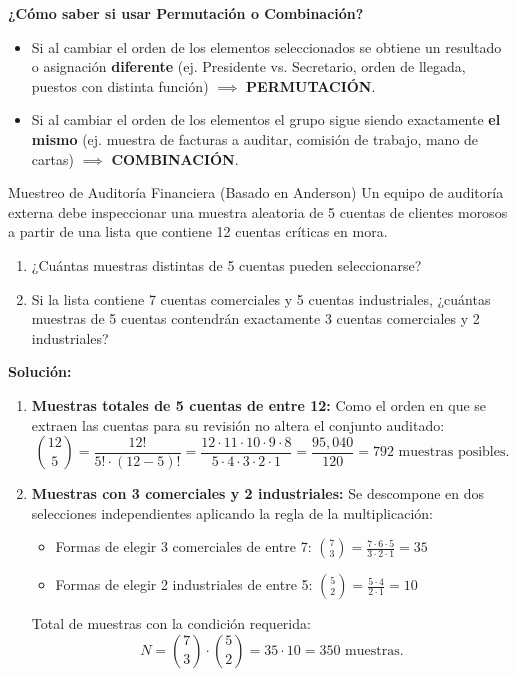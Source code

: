 \begin{alerta}
\textbf{¿Cómo saber si usar Permutación o Combinación?}
\begin{itemize}
    \item Si al cambiar el orden de los elementos seleccionados se obtiene un resultado o asignación \textbf{diferente} (ej. Presidente vs. Secretario, orden de llegada, puestos con distinta función) $\implies$ \textbf{PERMUTACIÓN}.
    \item Si al cambiar el orden de los elementos el grupo sigue siendo exactamente \textbf{el mismo} (ej. muestra de facturas a auditar, comisión de trabajo, mano de cartas) $\implies$ \textbf{COMBINACIÓN}.
\end{itemize}
\end{alerta}

\begin{ejemplo}{Muestreo de Auditoría Financiera (Basado en Anderson)}
Un equipo de auditoría externa debe inspeccionar una muestra aleatoria de 5 cuentas de clientes morosos a partir de una lista que contiene 12 cuentas críticas en mora.
\begin{enumerate}[label=\alph*)]
    \item ¿Cuántas muestras distintas de 5 cuentas pueden seleccionarse?
    \item Si la lista contiene 7 cuentas comerciales y 5 cuentas industriales, ¿cuántas muestras de 5 cuentas contendrán exactamente 3 cuentas comerciales y 2 industriales?
\end{enumerate}

\tcbline
\textbf{Solución:}
\begin{enumerate}[label=\alph*)]
    \item \textbf{Muestras totales de 5 cuentas de entre 12:}
    Como el orden en que se extraen las cuentas para su revisión no altera el conjunto auditado:
    \[
    \binom{12}{5} = \frac{12!}{5! \cdot (12-5)!} = \frac{12 \cdot 11 \cdot 10 \cdot 9 \cdot 8}{5 \cdot 4 \cdot 3 \cdot 2 \cdot 1} = \frac{95{,}040}{120} = 792 \text{ muestras posibles.}
    \]
    \item \textbf{Muestras con 3 comerciales y 2 industriales:}
    Se descompone en dos selecciones independientes aplicando la regla de la multiplicación:
    \begin{itemize}
        \item Formas de elegir 3 comerciales de entre 7: $\binom{7}{3} = \frac{7 \cdot 6 \cdot 5}{3 \cdot 2 \cdot 1} = 35$
        \item Formas de elegir 2 industriales de entre 5: $\binom{5}{2} = \frac{5 \cdot 4}{2 \cdot 1} = 10$
    \end{itemize}
    Total de muestras con la condición requerida:
    \[
    N = \binom{7}{3} \cdot \binom{5}{2} = 35 \cdot 10 = 350 \text{ muestras.}
    \]
\end{enumerate}
\end{ejemplo}

